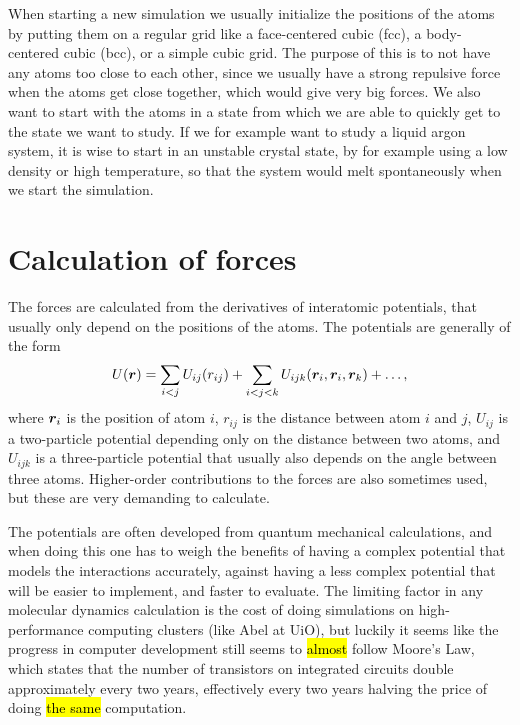 When starting a new simulation we usually initialize the positions of the atoms by putting them on a regular grid like a face-centered cubic (fcc), a body-centered cubic (bcc), or a simple cubic grid. The purpose of this is to not have any atoms too close to each other, since we usually have a strong repulsive force when the atoms get close together, which would give very big forces. We also want to start with the atoms in a state from which we are able to quickly get to the state we want to study. If we for example want to study a liquid argon system, it is wise to start in an unstable crystal state, by for example using a low density or high temperature, so that the system would melt spontaneously when we start the simulation.

\section{Calculation of forces\label{sec:program:lj}}
The forces are calculated from the derivatives of interatomic potentials, that usually only depend on the positions of the atoms. The potentials are generally of the form
\begin{align*}
    U(\boldsymbol{r}) = \sum_{i<j} U_{ij}(r_{ij}) + \sum_{i<j<k} U_{ijk}(\boldsymbol{r}_i, \boldsymbol{r}_i, \boldsymbol{r}_k) + \dots,
\end{align*}
where $\boldsymbol{r}_i$ is the position of atom $i$, $r_{ij}$ is the distance between atom $i$ and $j$, $U_{ij}$ is a two-particle potential depending only on the distance between two atoms, and $U_{ijk}$ is a three-particle potential that usually also depends on the angle between three atoms. Higher-order contributions to the forces are also sometimes used, but these are very demanding to calculate.

The potentials are often developed from quantum mechanical calculations, and when doing this one has to weigh the benefits of having a complex potential that models the interactions accurately, against having a less complex potential that will be easier to implement, and faster to evaluate. The limiting factor in any molecular dynamics calculation is the cost of doing simulations on high-performance computing clusters (like Abel at UiO), but luckily it seems like the progress in computer development still seems to \hl{almost} follow Moore's Law\cite{mack2011moore}, which states that the number of transistors on integrated circuits double approximately every two years\cite{moore1965cramming}, effectively every two years halving the price of doing \hl{the same} computation.

